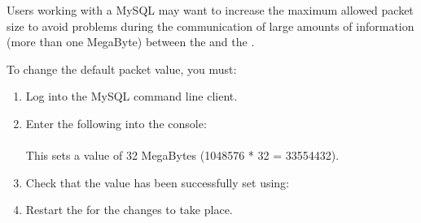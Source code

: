 Users working with a MySQL \gddb{} may want to increase the maximum allowed packet size to avoid problems during the communication of large amounts of information (more than one MegaByte) between the \gdagent{} and the \ite{}.

To change the default packet value, you must:

\begin{enumerate}
\item Log into the MySQL command line client.
\item Enter the following into the console:\\
\\
This sets a value of 32  MegaBytes (1048576 * 32 = 33554432).
\item Check that the value has been successfully set using:\\
\item Restart the \ite{} for the changes to take place.
\end{enumerate}
